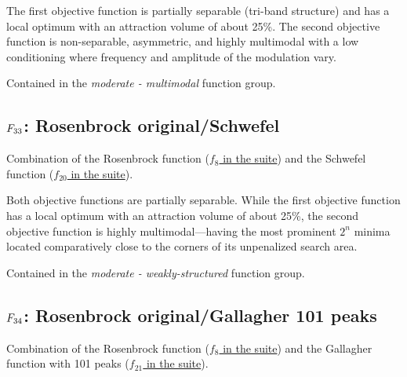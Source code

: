 The first objective function is partially separable (tri-band structure)
and has a local optimum with an attraction volume of about 25\%.
The second objective function is non-separable, asymmetric, and
highly multimodal with a low conditioning where
frequency and amplitude of the modulation vary.

Contained in the \emph{moderate - multimodal} function group.



\subsection[\texorpdfstring{\protect\(F_{33}\protect\): Rosenbrock original/Schwefel}{F33: Rosenbrock original/Schwefel}]{\texorpdfstring{\protect\(F_{33}\protect\): Rosenbrock original/Schwefel}{}}
\label{index:rosenbrock-original-schwefel}\label{index:f33}
Combination of the Rosenbrock function (\href{https://coco.gforge.inria.fr/downloads/download16.00/bbobdocfunctions.pdf\#page=40}{\(f_8\) in the \bbob suite}) and the
Schwefel function (\href{https://coco.gforge.inria.fr/downloads/download16.00/bbobdocfunctions.pdf\#page=100}{\(f_{20}\) in the \bbob suite}).

Both objective functions are partially separable.
While the first objective function has a local optimum with an attraction
volume of about 25\%, the second objective function is highly
multimodal---having the most prominent \(2^n\) minima located
comparatively close to the corners of its unpenalized search area.

Contained in the \emph{moderate - weakly-structured} function group.



\subsection[\texorpdfstring{\protect\(F_{34}\protect\): Rosenbrock original/Gallagher 101 peaks}{F34: Rosenbrock original/Gallagher 101 peaks}]{\texorpdfstring{\protect\(F_{34}\protect\): Rosenbrock original/Gallagher 101 peaks}{}}
\label{index:f34}\label{index:rosenbrock-original-gallagher-101-peaks}
Combination of the Rosenbrock function (\href{https://coco.gforge.inria.fr/downloads/download16.00/bbobdocfunctions.pdf\#page=40}{\(f_8\) in the \bbob suite}) and
the Gallagher function with 101 peaks (\href{https://coco.gforge.inria.fr/downloads/download16.00/bbobdocfunctions.pdf\#page=105}{\(f_{21}\) in the \bbob suite}).

